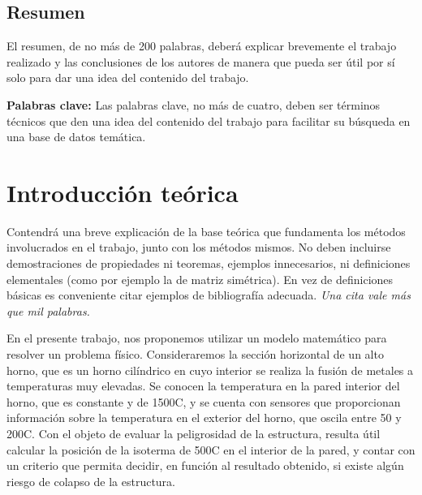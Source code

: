 \documentclass[11pt, a4paper, spanish]{article}
\let\strong\textbf
\theoremstyle{plain}
\theoremstyle{remark}
\begin{document}


\maketitle
\newpage

\begin{addmargin}[4em]{4em}

\section*{\centering Resumen}
  {\color{Gray} El resumen, de no más de 200 palabras, deberá explicar brevemente el trabajo realizado y las conclusiones de los autores de manera que pueda ser útil por sí solo para dar una idea del contenido del trabajo.}

\vspace{4em}
\noindent \strong{Palabras clave:} {\color{Gray} Las palabras clave, no más de cuatro, deben ser términos técnicos que den una idea del contenido del trabajo para facilitar su búsqueda en una base de datos temática.}

\end{addmargin}
\newpage

\tableofcontents
\newpage

\section{Introducción teórica}

  {\color{Gray} Contendrá una breve explicación de la base teórica que fundamenta los métodos involucrados en el trabajo, junto con los métodos mismos. No deben incluirse demostraciones de propiedades ni teoremas, ejemplos innecesarios, ni definiciones elementales (como por ejemplo la de matriz simétrica). En vez de definiciones básicas es conveniente citar ejemplos de bibliografía adecuada. \emph{Una cita vale más que mil palabras.}}

  En el presente trabajo, nos proponemos utilizar un modelo matemático para resolver un problema físico. Consideraremos la sección horizontal de un alto horno, que es un horno cilíndrico en cuyo interior se realiza la fusión de metales a temperaturas muy elevadas. Se conocen la temperatura en la pared interior del horno, que es constante y de 1500{\degree}C, y se cuenta con sensores que proporcionan información sobre la temperatura en el exterior del horno, que oscila entre 50 y 200{\degree}C. Con el objeto de evaluar la peligrosidad de la estructura, resulta útil calcular la posición de la isoterma de 500{\degree}C en el interior de la pared, y contar con un criterio que permita decidir, en función al resultado obtenido, si existe algún riesgo de colapso de la estructura.
\end{document}
